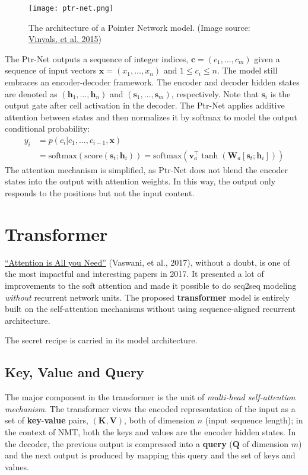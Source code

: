 \documentclass[12pt]{article}
\begin{document}
\begin{figure}[H]
    \centering
    \texttt{[image: ptr-net.png]}
    \caption{The architecture of a Pointer Network model. (Image source: \href{https://arxiv.org/abs/1506.03134}{Vinyals, et al. 2015})}
\end{figure}

The Ptr-Net outputs a sequence of integer indices, $\boldsymbol{c} = (c_1, \dots, c_m)$ given a sequence of input vectors $\boldsymbol{x} = (x_1, \dots, x_n)$ and $1 \leq c_i \leq n$. The model still embraces an encoder-decoder framework. The encoder and decoder hidden states are denoted as $(\boldsymbol{h}_1, \dots, \boldsymbol{h}_n)$ and $(\boldsymbol{s}_1, \dots, \boldsymbol{s}_m)$, respectively. Note that $\mathbf{s}_i$ is the output gate after cell activation in the decoder. The Ptr-Net applies additive attention between states and then normalizes it by softmax to model the output conditional probability:
\[
\begin{aligned}
y_i &= p(c_i \vert c_1, \dots, c_{i-1}, \boldsymbol{x}) \\
    &= \text{softmax}(\text{score}(\boldsymbol{s}_t; \boldsymbol{h}_i)) = \text{softmax}(\mathbf{v}_a^\top \tanh(\mathbf{W}_a[\boldsymbol{s}_t; \boldsymbol{h}_i]))
\end{aligned}
\]
The attention mechanism is simplified, as Ptr-Net does not blend the encoder states into the output with attention weights. In this way, the output only responds to the positions but not the input content.

\section{Transformer}
\href{http://papers.nips.cc/paper/7181-attention-is-all-you-need.pdf}{``Attention is All you Need''} (Vaswani, et al., 2017), without a doubt, is one of the most impactful and interesting papers in 2017. It presented a lot of improvements to the soft attention and made it possible to do seq2seq modeling \emph{without} recurrent network units. The proposed \textbf{transformer} model is entirely built on the self-attention mechanisms without using sequence-aligned recurrent architecture.

The secret recipe is carried in its model architecture.

\subsection{Key, Value and Query}
The major component in the transformer is the unit of \emph{multi-head self-attention mechanism}. The transformer views the encoded representation of the input as a set of \textbf{key}-\textbf{value} pairs, $(\mathbf{K}, \mathbf{V})$, both of dimension $n$ (input sequence length); in the context of NMT, both the keys and values are the encoder hidden states. In the decoder, the previous output is compressed into a \textbf{query} ($\mathbf{Q}$ of dimension $m$) and the next output is produced by mapping this query and the set of keys and values.
\end{document}
